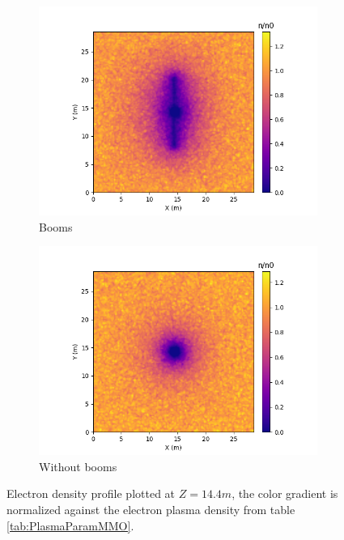 \begin{center}
    \begin{figure}[H]
      \begin{subfigure}[b]{0.61\textwidth}
      \includegraphics[width=\textwidth]{figures/MMO/noPH/WB/E_noPH_WB.png}
      \caption{Booms}
      \label{fig:E_noPH_WB}
    \end{subfigure}
    \begin{subfigure}[b]{0.61\textwidth}
      \includegraphics[width=\textwidth]{figures/MMO/noPH/NB/E_noPH_NB.png}
      \caption{Without booms}
      \label{fig:E_noPH_NB}
    \end{subfigure}
  \label{fig:Elec_noPH}
  \caption{Electron density profile plotted at $Z = 14.4 m$, the color gradient is normalized against the electron plasma density from table \ref{tab:PlasmaParamMMO}.}
  \end{figure}
\end{center}


